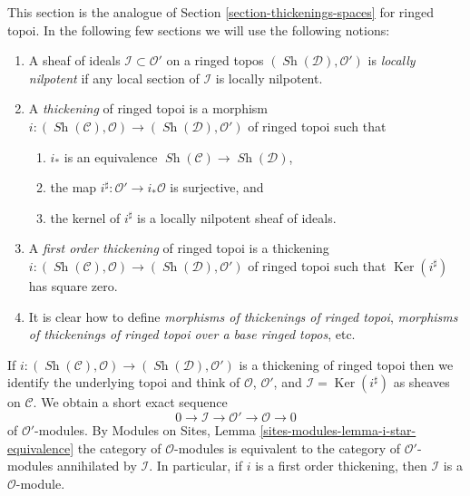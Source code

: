 \documentclass{stacks-project}
\theoremstyle{plain}
\theoremstyle{definition}
\theoremstyle{remark}
\numberwithin{equation}{subsection}
\def\Sh{\mathop{\mathit{Sh}}\nolimits}
\def\Ker{\mathop{\mathrm{Ker}}}
\begin{document}
\noindent
This section is the analogue of Section \ref{section-thickenings-spaces}
for ringed topoi.
In the following few sections we will use the following notions:
\begin{enumerate}
\item A sheaf of ideals $\mathcal{I} \subset \mathcal{O}'$ on
a ringed topos $(\Sh(\mathcal{D}), \mathcal{O}')$ is {\it locally nilpotent}
if any local section of $\mathcal{I}$ is locally nilpotent.
\item A {\it thickening} of ringed topoi is a morphism
$i : (\Sh(\mathcal{C}), \mathcal{O}) \to (\Sh(\mathcal{D}), \mathcal{O}')$
of ringed topoi such that
\begin{enumerate}
\item $i_*$ is an equivalence $\Sh(\mathcal{C}) \to \Sh(\mathcal{D})$,
\item the map $i^\sharp : \mathcal{O}' \to i_*\mathcal{O}$
is surjective, and
\item the kernel of $i^\sharp$ is a locally nilpotent sheaf of ideals.
\end{enumerate}
\item A {\it first order thickening} of ringed topoi is a thickening
$i : (\Sh(\mathcal{C}), \mathcal{O}) \to (\Sh(\mathcal{D}), \mathcal{O}')$
of ringed topoi such that $\Ker(i^\sharp)$ has square zero.
\item It is clear how to define
{\it morphisms of thickenings of ringed topoi},
{\it morphisms of thickenings of ringed topoi over a base ringed topos}, etc.
\end{enumerate}
If
$i : (\Sh(\mathcal{C}), \mathcal{O}) \to (\Sh(\mathcal{D}), \mathcal{O}')$
is a thickening of ringed topoi then we identify the underlying topoi
and think of $\mathcal{O}$, $\mathcal{O}'$, and
$\mathcal{I} = \Ker(i^\sharp)$ as sheaves on $\mathcal{C}$.
We obtain a short exact sequence
$$
0 \to \mathcal{I} \to \mathcal{O}' \to \mathcal{O} \to 0
$$
of $\mathcal{O}'$-modules. By
Modules on Sites, Lemma \ref{sites-modules-lemma-i-star-equivalence}
the category of $\mathcal{O}$-modules is equivalent to the category
of $\mathcal{O}'$-modules annihilated by $\mathcal{I}$. In particular,
if $i$ is a first order thickening, then
$\mathcal{I}$ is a $\mathcal{O}$-module.
\end{document}
